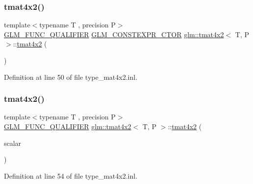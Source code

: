 \subsubsection{\texorpdfstring{tmat4x2()}{tmat4x2()}\hspace{0.1cm}{\footnotesize\ttfamily [4/22]}}
{\footnotesize\ttfamily template$<$typename T , precision P$>$ \\
\mbox{\hyperlink{setup_8hpp_a33fdea6f91c5f834105f7415e2a64407}{G\+L\+M\+\_\+\+F\+U\+N\+C\+\_\+\+Q\+U\+A\+L\+I\+F\+I\+ER}} \mbox{\hyperlink{setup_8hpp_ad34178a09666081abdb573c14d1f4a5a}{G\+L\+M\+\_\+\+C\+O\+N\+S\+T\+E\+X\+P\+R\+\_\+\+C\+T\+OR}} \mbox{\hyperlink{structglm_1_1tmat4x2}{glm\+::tmat4x2}}$<$ T, P $>$\+::\mbox{\hyperlink{structglm_1_1tmat4x2}{tmat4x2}} (\begin{DoxyParamCaption}\item[{\mbox{\hyperlink{namespaceglm_a807df837905ec286f806a536af03b57f}{ctor}}}]{ }\end{DoxyParamCaption})\hspace{0.3cm}{\ttfamily [explicit]}}



Definition at line 50 of file type\+\_\+mat4x2.\+inl.

\mbox{\label{structglm_1_1tmat4x2_a1dceed004da8ca2a8badf694c6f61ced}} 
\subsubsection{\texorpdfstring{tmat4x2()}{tmat4x2()}\hspace{0.1cm}{\footnotesize\ttfamily [5/22]}}
{\footnotesize\ttfamily template$<$typename T , precision P$>$ \\
\mbox{\hyperlink{setup_8hpp_a33fdea6f91c5f834105f7415e2a64407}{G\+L\+M\+\_\+\+F\+U\+N\+C\+\_\+\+Q\+U\+A\+L\+I\+F\+I\+ER}} \mbox{\hyperlink{structglm_1_1tmat4x2}{glm\+::tmat4x2}}$<$ T, P $>$\+::\mbox{\hyperlink{structglm_1_1tmat4x2}{tmat4x2}} (\begin{DoxyParamCaption}\item[{T}]{scalar }\end{DoxyParamCaption})\hspace{0.3cm}{\ttfamily [explicit]}}



Definition at line 54 of file type\+\_\+mat4x2.\+inl.

